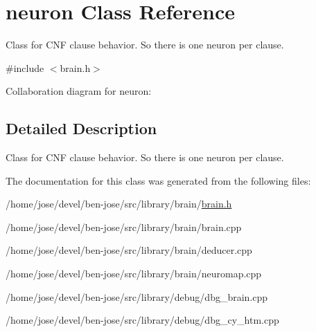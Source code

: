\hypertarget{classneuron}{}\section{neuron Class Reference}
\label{classneuron}


Class for C\+NF clause behavior. So there is one neuron per clause.  




{\ttfamily \#include $<$brain.\+h$>$}



Collaboration diagram for neuron\+:


\subsection{Detailed Description}
Class for C\+NF clause behavior. So there is one neuron per clause. 

The documentation for this class was generated from the following files\+:\begin{DoxyCompactItemize}
\item 
/home/jose/devel/ben-\/jose/src/library/brain/\hyperlink{brain_8h}{brain.\+h}\item 
/home/jose/devel/ben-\/jose/src/library/brain/brain.\+cpp\item 
/home/jose/devel/ben-\/jose/src/library/brain/deducer.\+cpp\item 
/home/jose/devel/ben-\/jose/src/library/brain/neuromap.\+cpp\item 
/home/jose/devel/ben-\/jose/src/library/debug/dbg\+\_\+brain.\+cpp\item 
/home/jose/devel/ben-\/jose/src/library/debug/dbg\+\_\+cy\+\_\+htm.\+cpp\end{DoxyCompactItemize}
